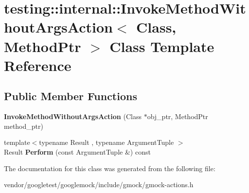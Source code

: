 \hypertarget{classtesting_1_1internal_1_1InvokeMethodWithoutArgsAction}{}\section{testing\+:\+:internal\+:\+:Invoke\+Method\+Without\+Args\+Action$<$ Class, Method\+Ptr $>$ Class Template Reference}
\label{classtesting_1_1internal_1_1InvokeMethodWithoutArgsAction}
\subsection*{Public Member Functions}
\begin{DoxyCompactItemize}
\item 
{\bfseries Invoke\+Method\+Without\+Args\+Action} (Class $\ast$obj\+\_\+ptr, Method\+Ptr method\+\_\+ptr)\hypertarget{classtesting_1_1internal_1_1InvokeMethodWithoutArgsAction_ac4d655e386f47a96c7a6e1670b20e991}{}\label{classtesting_1_1internal_1_1InvokeMethodWithoutArgsAction_ac4d655e386f47a96c7a6e1670b20e991}

\item 
{\footnotesize template$<$typename Result , typename Argument\+Tuple $>$ }\\Result {\bfseries Perform} (const Argument\+Tuple \&) const \hypertarget{classtesting_1_1internal_1_1InvokeMethodWithoutArgsAction_ad33ed69b4b6aade57c8b51ae41dfe276}{}\label{classtesting_1_1internal_1_1InvokeMethodWithoutArgsAction_ad33ed69b4b6aade57c8b51ae41dfe276}

\end{DoxyCompactItemize}


The documentation for this class was generated from the following file\+:\begin{DoxyCompactItemize}
\item 
vendor/googletest/googlemock/include/gmock/gmock-\/actions.\+h\end{DoxyCompactItemize}
